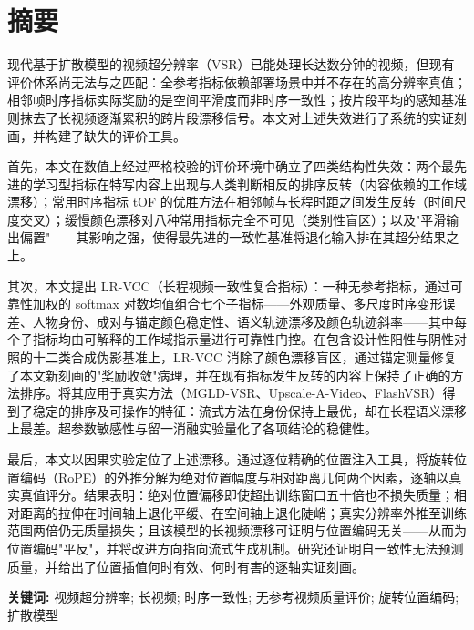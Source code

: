 \chapter*{摘要}
\thispagestyle{previous}

现代基于扩散模型的视频超分辨率（VSR）已能处理长达数分钟的视频，但现有评价体系尚无法与之匹配：全参考指标依赖部署场景中并不存在的高分辨率真值；相邻帧时序指标实际奖励的是空间平滑度而非时序一致性；按片段平均的感知基准则抹去了长视频逐渐累积的跨片段漂移信号。本文对上述失效进行了系统的实证刻画，并构建了缺失的评价工具。

首先，本文在数值上经过严格校验的评价环境中确立了四类结构性失效：两个最先进的学习型指标在特写内容上出现与人类判断相反的排序反转（内容依赖的工作域漂移）；常用时序指标 tOF 的优胜方法在相邻帧与长程时距之间发生反转（时间尺度交叉）；缓慢颜色漂移对八种常用指标完全不可见（类别性盲区）；以及"平滑输出偏置"——其影响之强，使得最先进的一致性基准将退化输入排在其超分结果之上。

其次，本文提出 LR-VCC（长程视频一致性复合指标）：一种无参考指标，通过可靠性加权的 softmax 对数均值组合七个子指标——外观质量、多尺度时序变形误差、人物身份、成对与锚定颜色稳定性、语义轨迹漂移及颜色轨迹斜率——其中每个子指标均由可解释的工作域指示量进行可靠性门控。在包含设计性阳性与阴性对照的十二类合成伪影基准上，LR-VCC 消除了颜色漂移盲区，通过锚定测量修复了本文新刻画的"奖励收敛"病理，并在现有指标发生反转的内容上保持了正确的方法排序。将其应用于真实方法（MGLD-VSR、Upscale-A-Video、FlashVSR）得到了稳定的排序及可操作的特征：流式方法在身份保持上最优，却在长程语义漂移上最差。超参数敏感性与留一消融实验量化了各项结论的稳健性。

最后，本文以因果实验定位了上述漂移。通过逐位精确的位置注入工具，将旋转位置编码（RoPE）的外推分解为绝对位置幅度与相对距离几何两个因素，逐轴以真实真值评分。结果表明：绝对位置偏移即使超出训练窗口五十倍也不损失质量；相对距离的拉伸在时间轴上退化平缓、在空间轴上退化陡峭；真实分辨率外推至训练范围两倍仍无质量损失；且该模型的长视频漂移可证明与位置编码无关——从而为位置编码"平反"，并将改进方向指向流式生成机制。研究还证明自一致性无法预测质量，并给出了位置插值何时有效、何时有害的逐轴实证刻画。

\textbf{关键词:} 视频超分辨率; 长视频; 时序一致性; 无参考视频质量评价; 旋转位置编码; 扩散模型